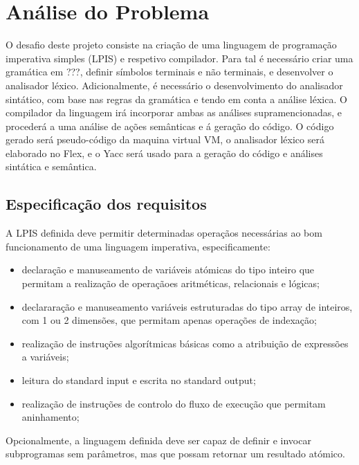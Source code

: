 \chapter{Análise do Problema}
\label{cap:analise}

O desafio deste projeto consiste na criação de uma linguagem de programação imperativa simples (LPIS) e respetivo compilador.
Para tal é necessário criar uma gramática em ???, definir símbolos terminais e não terminais, e desenvolver o analisador léxico. Adicionalmente, é necessário o desenvolvimento do analisador sintático, com base nas regras da gramática e tendo em conta a análise léxica. O compilador da linguagem irá incorporar ambas as análises supramencionadas, e procederá a uma análise de ações semânticas e á geração do código. 
O código gerado será pseudo-código da maquina virtual VM, o analisador léxico será elaborado no Flex, e o Yacc será usado para a geração do código e análises sintática e semântica.   


\section{Especificação dos requisitos}
\label{sec:especificacao:analise}

A LPIS definida deve permitir determinadas operaçãos necessárias ao bom funcionamento de uma linguagem imperativa, especificamente:

\begin{itemize}
\item declaração e manuseamento de variáveis atómicas do tipo inteiro que permitam a realização de operaçãoes aritméticas, relacionais e lógicas;
\item declararação e manuseamento variáveis estruturadas do tipo array de inteiros, com 1 ou 2 dimensões, que permitam apenas operações de indexação;
\item realização de instruções algorítmicas básicas como a atribuição de expressões a variáveis;
\item leitura do standard input e escrita no standard output;
\item realização de instruções de controlo do fluxo de execução que permitam aninhamento;
\end{itemize}

Opcionalmente, a linguagem definida deve ser capaz de definir e invocar subprogramas sem parâmetros, mas que possam retornar um resultado atómico.

\newpage

